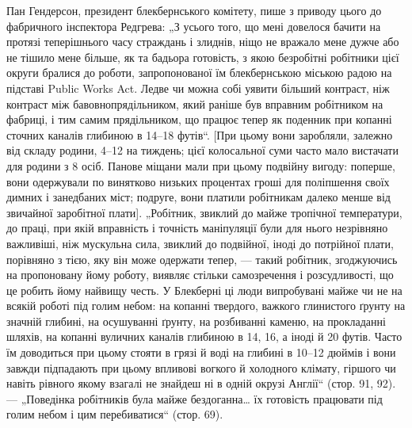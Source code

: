Пан Гендерсон, президент блекбернського комітету, пише
з приводу цього до фабричного інспектора Редгрева: „З усього
того, що мені довелося бачити на протязі теперішнього часу
страждань і злиднів, ніщо не вражало мене дужче або не тішило
мене більше, як та бадьора готовість, з якою безробітні
робітники цієї округи бралися до роботи, запропонованої їм
блекбернською міською радою на підставі Public Works Act.
Ледве чи можна собі уявити більший контраст, ніж контраст
між бавовнопрядільником, який раніше був вправним робітником
на фабриці, і тим самим прядільником, що працює тепер як
поденник при копанні сточних каналів глибиною в 14--18 футів“.
[При цьому вони заробляли, залежно від складу родини, 4--12 на тиждень; цієї колосальної суми часто мало вистачати
для родини з 8 осіб. Панове міщани мали при цьому подвійну
вигоду: поперше, вони одержували по винятково низьких
процентах гроші для поліпшення своїх димних і занедбаних
міст; подруге, вони платили робітникам далеко менше від звичайної
заробітної плати]. „Робітник, звиклий до майже тропічної
температури, до праці, при якій вправність і точність маніпуляції
були для нього незрівняно важливіші, ніж мускульна сила,
звиклий до подвійної, іноді до потрійної плати, порівняно з тією,
яку він може одержати тепер, — такий робітник, згоджуючись
на пропоновану йому роботу, виявляє стільки самозречення
і розсудливості, що це робить йому найвищу честь. У Блекберні
ці люди випробувані майже чи не на всякій роботі під голим
небом: на копанні твердого, важкого глинистого ґрунту на
значній глибині, на осушуванні ґрунту, на розбиванні каменю,
на прокладанні шляхів, на копанні вуличних каналів глибиною
в 14, 16, а іноді й 20 футів. Часто їм доводиться при цьому
стояти в грязі й воді на глибині в 10--12 дюймів і вони завжди
підпадають при цьому впливові вогкого й холодного клімату,
гіршого чи навіть рівного якому взагалі не знайдеш ні в одній
окрузі Англії“ (стор. 91, 92). — „Поведінка робітників була майже
бездоганна\dots{} їх готовість працювати під голим небом і цим
перебиватися“ (стор. 69).

